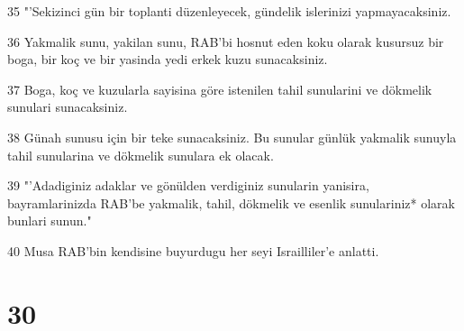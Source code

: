 \par 35 "'Sekizinci gün bir toplanti düzenleyecek, gündelik islerinizi yapmayacaksiniz.
\par 36 Yakmalik sunu, yakilan sunu, RAB'bi hosnut eden koku olarak kusursuz bir boga, bir koç ve bir yasinda yedi erkek kuzu sunacaksiniz.
\par 37 Boga, koç ve kuzularla sayisina göre istenilen tahil sunularini ve dökmelik sunulari sunacaksiniz.
\par 38 Günah sunusu için bir teke sunacaksiniz. Bu sunular günlük yakmalik sunuyla tahil sunularina ve dökmelik sunulara ek olacak.
\par 39 "'Adadiginiz adaklar ve gönülden verdiginiz sunularin yanisira, bayramlarinizda RAB'be yakmalik, tahil, dökmelik ve esenlik sunulariniz* olarak bunlari sunun."
\par 40 Musa RAB'bin kendisine buyurdugu her seyi Israilliler'e anlatti.

\chapter{30}

